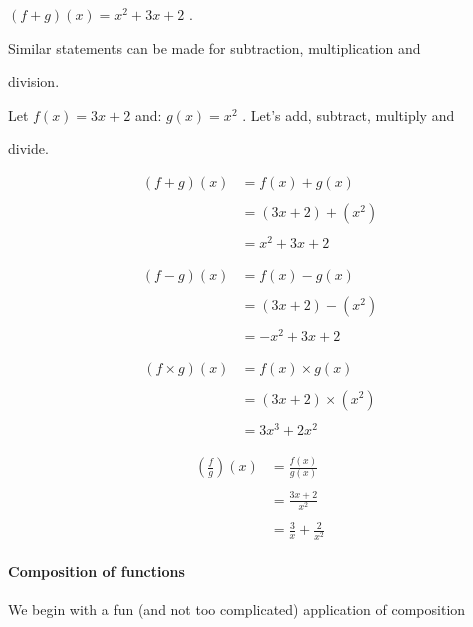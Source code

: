     $(f+g)(x)=x^2+3x+2$ .



Similar statements can be made for subtraction, multiplication and

division.



Let $f(x)=3x+2$ and: $g(x)=x^2$ . Let's add, subtract, multiply and

divide.



\begin{align}(f+g)(x) &= f(x)+g(x) \\\\ &= (3x+2)+(x^2) \\\\ &= x^2+3x+2 \end{align} 



\begin{align} (f-g)(x) &= f(x)-g(x) \\\\ &= (3x+2)-(x^2) \\\\ &= -x^2+3x+2 \end{align} 



\begin{align} (f\times g)(x) &= f(x)\times g(x) \\\\ &= (3x+2)\times(x^2) \\\\ &= 3x^3+2x^2 \end{align} 



\begin{align} \left(\frac{f}{g}\right)(x) &= \frac{f(x)}{g(x)} \\\\ &= \frac{3x+2}{x^2} \\\\ &= \frac{3}{x}+\frac{2}{x^2} \end{align} 



\paragraph{Composition of functions}



We begin with a fun (and not too complicated) application of composition

